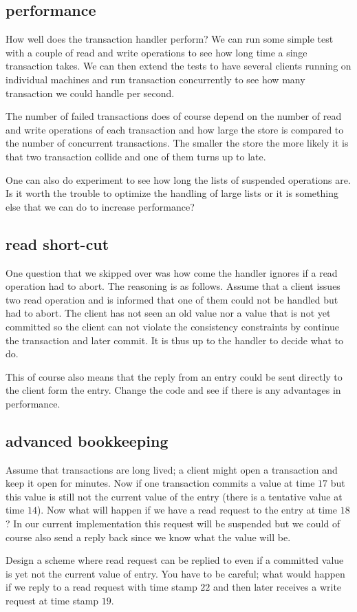 \documentclass[a4paper, 11pt]{article}
\begin{document}
\subsection{performance}

How well does the transaction handler perform? We can run some simple
test with a couple of read and write operations to see how long time a
singe transaction takes. We can then extend the tests to have several
clients running on individual machines and run transaction concurrently
to see how many transaction we could handle per second.

The number of failed transactions does of course depend on the number
of read and write operations of each transaction and how large the
store is compared to the number of concurrent transactions. The smaller
the store the more likely it is that two transaction collide and one
of them turns up to late. 

One can also do experiment to see how long the lists of suspended
operations are. Is it worth the trouble to optimize the handling of
large lists or it is something else that we can do to increase
performance?

\subsection{read short-cut}

One question that we skipped over was how come the handler ignores if a
read operation had to abort. The reasoning is as follows. Assume that a
client issues two read operation and is informed that one of them
could not be handled but had to abort. The client has not seen an old
value nor a value that is not yet committed so the client can not
violate the consistency constraints by continue the transaction and
later commit. It is thus up to the handler to decide what to do.

This of course also means that the reply from an entry could be sent
directly to the client form the entry. Change the code and see if
there is any advantages in performance.


\subsection{advanced bookkeeping}

Assume that transactions are long lived; a client might open a
transaction and keep it open for minutes. Now if one transaction
commits a value at time $17$ but this value is still not the current
value of the entry (there is a tentative value at time $14$). Now what
will happen if we have a read request to the entry at time $18$? In
our current implementation this request will be suspended but we could
of course also send a reply back since we know what the value will be.

Design a scheme where read request can be replied to even if a
committed value is yet not the current value of entry. You have to be
careful; what would happen if we reply to a read request with time
stamp $22$ and then later receives a write request at time stamp $19$.
\end{document}
